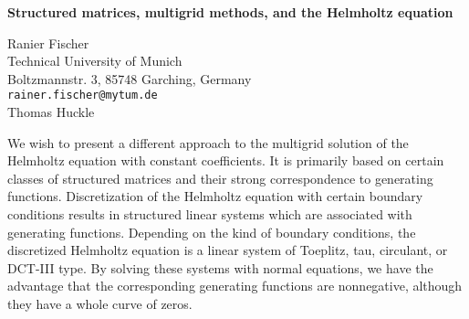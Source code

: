 \documentclass{report}
\begin{document}

\begin{center}
{\large
{\bf Structured matrices, multigrid methods, and the Helmholtz equation}}

	Ranier Fischer \\
	Technical University of Munich \\
	Boltzmannstr. 3, 85748 Garching, Germany \\
	{\tt rainer.fischer@mytum.de} \\
	Thomas Huckle
\end{center}
We wish to present a different approach to the multigrid
solution of the Helmholtz equation with constant
coefficients. It is primarily based on certain classes of
structured matrices and their strong correspondence to
generating functions. Discretization of the Helmholtz
equation with certain boundary conditions results in
structured linear systems which are associated with
generating functions. Depending on the kind of boundary
conditions, the discretized Helmholtz equation is a linear
system of Toeplitz, tau, circulant, or DCT-III type. By
solving these systems with normal equations, we have the
advantage that the corresponding generating functions are
nonnegative, although they have a whole curve of zeros.
\end{document}
